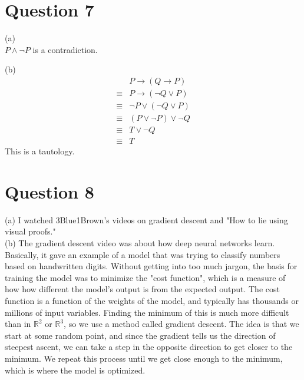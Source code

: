 \documentclass{article}
\begin{document}
\section*{Question 7}
(a) \\
$P \land \neg P$ is a contradiction.

\vspace{0.5cm}
\noindent
(b) \\
\begin{align*}
    &P \rightarrow (Q \rightarrow P) \\
    \equiv &P \rightarrow (\neg Q \lor P) \\
    \equiv &\neg P \lor (\neg Q \lor P) \\
    \equiv &(P \lor \neg P) \lor \neg Q \\
    \equiv &T \lor \neg Q \\
    \equiv &T
\end{align*}
This is a tautology.

\section*{Question 8}
(a) I watched 3Blue1Brown's videos on gradient descent and "How to lie using visual proofs." \\

\noindent (b) The gradient descent video was about how deep neural networks learn.
Basically, it gave an example of a model that was trying to classify numbers based on handwritten digits.
Without getting into too much jargon, the basis for training the model was to minimize the "cost function", which is a measure of how how different the model's output is from the expected output.
The cost function is a function of the weights of the model, and typically has thousands or millions of input variables.
Finding the minimum of this is much more difficult than in $\mathbb{R}^2$ or $\mathbb{R}^3$, so we use a method called gradient descent.
The idea is that we start at some random point, and since the gradient tells us the direction of steepest ascent, we can take a step in the opposite direction to get closer to the minimum.
We repeat this process until we get close enough to the minimum, which is where the model is optimized.
\end{document}
